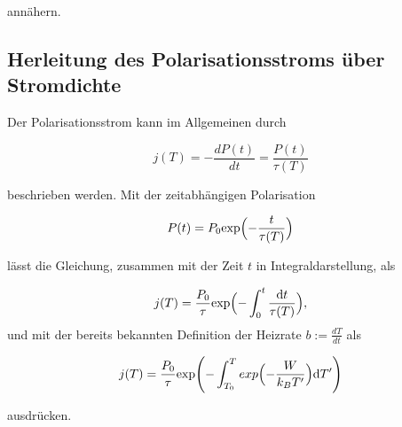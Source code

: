 annähern.

\subsection{Herleitung des Polarisationsstroms über Stromdichte}
\label{sec:int}

Der Polarisationsstrom kann im Allgemeinen durch 

\begin{equation}
    j(T) = -\frac{dP(t)}{dt} = \frac{P(t)}{\tau(T)}
\end{equation}

beschrieben werden. Mit der zeitabhängigen Polarisation 

\begin{equation}
    P(t) = P_0 \text{exp} \Bigl( - \frac{t}{\tau(T)} \Bigr)
\end{equation}

lässt die Gleichung, zusammen mit der Zeit $t$ in Integraldarstellung, als 

\begin{equation}
    j(T) = \frac{P_0}{\tau} \text{exp} \Bigl( - \int_0^t \frac{\text{d}t}{\tau(T)} \Bigr),    
\end{equation} und mit der bereits bekannten Definition der Heizrate $b := \frac{dT}{dt}$ als 

\begin{equation}
    j(T) = \frac{P_0}{\tau} \text{exp} \Biggl( - \int_{T_0}^T exp \Bigl( -\frac{W}{k_B T'} \Bigr) \text{d}T' \Biggr)
\end{equation}

ausdrücken.